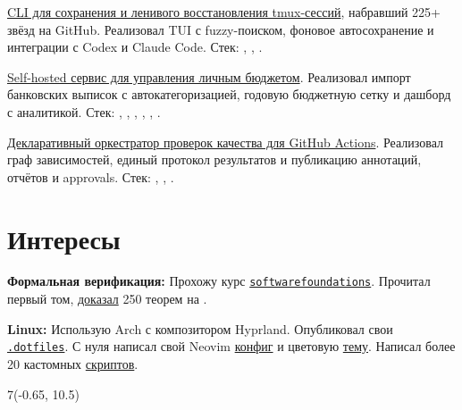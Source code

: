 \documentclass[margin,line]{resume}
\begin{document}
\begin{resume}
\begin{description}[leftmargin=0pt, itemindent=*, itemsep=3pt, topsep=2pt,
      parsep=0pt]
    \item[lazy-tmux:]
      \href{https://github.com/alchemmist/lazy-tmux}{CLI для сохранения и
      ленивого восстановления tmux-сессий}, набравший 225+ звёзд на GitHub.
      Реализовал TUI с fuzzy-поиском, фоновое автосохранение и интеграции с
      Codex и Claude Code. Стек: , ,
      .

    \item[monori:]
      \href{https://github.com/alchemmist/monori}{Self-hosted сервис для
      управления личным бюджетом}. Реализовал импорт банковских выписок с
      автокатегоризацией, годовую бюджетную сетку и дашборд с аналитикой.
      Стек: , , ,
      , , .

    \item[Quality Graph:]
      \href{https://github.com/alchemmist/quality-graph}{Декларативный
      оркестратор проверок качества для GitHub Actions}. Реализовал граф
      зависимостей, единый протокол результатов и публикацию аннотаций,
      отчётов и approvals. Стек: ,
      , .

  \end{description}

  \section{\mysidestyle Интересы}\vspace{0.7mm}

  {\textbf{Формальная верификация:} Прохожу курс
    \texttt{\href{https://softwarefoundations.cis.upenn.edu}{softwarefoundations}}.
    Прочитал первый том,
    \href{https://github.com/alchemmist/coq-learning}{доказал} 250
  теорем на .} \\

  \vspace{-6mm}

  \textbf{Linux:} Использую Arch с композитором Hyprland. Опубликовал
  свои
  \href{https:/github.com/alchemmist/.dotfiles}{\texttt{.dotfiles}}.
  С нуля написал свой Neovim
  \href{https://github.com/alchemmist/.dotfiles/tree/main/nvim}{конфиг}
  и цветовую
  \href{https://github.com/alchemmist/nothing.nvim}{тему}.
  Написал более 20 кастомных
  \href{https://github.com/alchemmist/.dotfiles/tree/main/scripts}{скриптов}.

\end{resume}

\begin{minipage}[H]{9.18\textwidth}
  \begin{textblock}{7}(-0.65, 10.5)
    \begingroup
    \hspace{35mm}
    \endgroup
  \end{textblock}

\end{minipage}

\clearpage
\end{document}
